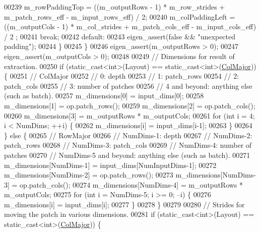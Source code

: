 \begin{DoxyCode}
00239           m\_rowPaddingTop = ((m\_outputRows - 1) * m\_row\_strides + m\_patch\_rows\_eff - m\_input\_rows\_eff) / 2;
00240           m\_colPaddingLeft = ((m\_outputCols - 1) * m\_col\_strides + m\_patch\_cols\_eff - m\_input\_cols\_eff) / 2
      ;
00241           \textcolor{keywordflow}{break};
00242         \textcolor{keywordflow}{default}:
00243           eigen\_assert(\textcolor{keyword}{false} && \textcolor{stringliteral}{"unexpected padding"});
00244       \}
00245     \}
00246     eigen\_assert(m\_outputRows > 0);
00247     eigen\_assert(m\_outputCols > 0);
00248 
00249     \textcolor{comment}{// Dimensions for result of extraction.}
00250     \textcolor{keywordflow}{if} (static\_cast<int>(Layout) == static\_cast<int>(\hyperlink{group__enums_ggaacded1a18ae58b0f554751f6cdf9eb13a0cbd4bdd0abcfc0224c5fcb5e4f6669a}{ColMajor})) \{
00251       \textcolor{comment}{// ColMajor}
00252       \textcolor{comment}{// 0: depth}
00253       \textcolor{comment}{// 1: patch\_rows}
00254       \textcolor{comment}{// 2: patch\_cols}
00255       \textcolor{comment}{// 3: number of patches}
00256       \textcolor{comment}{// 4 and beyond: anything else (such as batch).}
00257       m\_dimensions[0] = input\_dims[0];
00258       m\_dimensions[1] = op.patch\_rows();
00259       m\_dimensions[2] = op.patch\_cols();
00260       m\_dimensions[3] = m\_outputRows * m\_outputCols;
00261       \textcolor{keywordflow}{for} (\textcolor{keywordtype}{int} i = 4; i < NumDims; ++i) \{
00262         m\_dimensions[i] = input\_dims[i-1];
00263       \}
00264     \} \textcolor{keywordflow}{else} \{
00265       \textcolor{comment}{// RowMajor}
00266       \textcolor{comment}{// NumDims-1: depth}
00267       \textcolor{comment}{// NumDims-2: patch\_rows}
00268       \textcolor{comment}{// NumDims-3: patch\_cols}
00269       \textcolor{comment}{// NumDims-4: number of patches}
00270       \textcolor{comment}{// NumDims-5 and beyond: anything else (such as batch).}
00271       m\_dimensions[NumDims-1] = input\_dims[NumInputDims-1];
00272       m\_dimensions[NumDims-2] = op.patch\_rows();
00273       m\_dimensions[NumDims-3] = op.patch\_cols();
00274       m\_dimensions[NumDims-4] = m\_outputRows * m\_outputCols;
00275       \textcolor{keywordflow}{for} (\textcolor{keywordtype}{int} i = NumDims-5; i >= 0; --i) \{
00276         m\_dimensions[i] = input\_dims[i];
00277       \}
00278     \}
00279 
00280     \textcolor{comment}{// Strides for moving the patch in various dimensions.}
00281     \textcolor{keywordflow}{if} (static\_cast<int>(Layout) == static\_cast<int>(\hyperlink{group__enums_ggaacded1a18ae58b0f554751f6cdf9eb13a0cbd4bdd0abcfc0224c5fcb5e4f6669a}{ColMajor})) \{

\end{DoxyCode}
